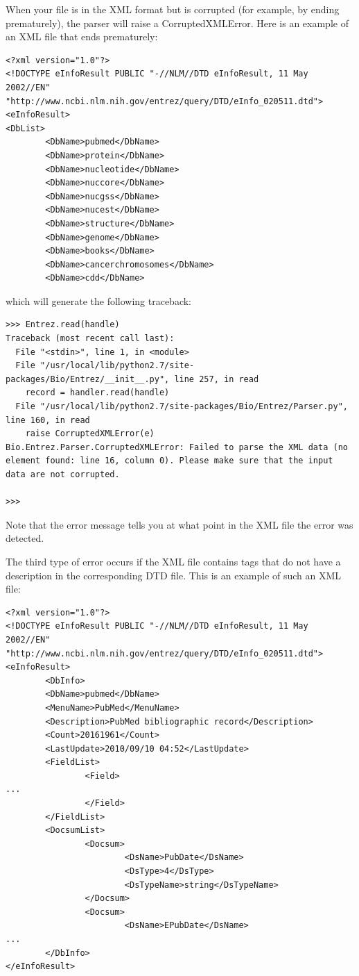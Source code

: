 \documentclass{report}
\begin{document}
When your file is in the XML format but is corrupted (for example, by ending prematurely), the parser will raise a CorruptedXMLError.
Here is an example of an XML file that ends prematurely:
\begin{verbatim}
<?xml version="1.0"?>
<!DOCTYPE eInfoResult PUBLIC "-//NLM//DTD eInfoResult, 11 May 2002//EN" "http://www.ncbi.nlm.nih.gov/entrez/query/DTD/eInfo_020511.dtd">
<eInfoResult>
<DbList>
        <DbName>pubmed</DbName>
        <DbName>protein</DbName>
        <DbName>nucleotide</DbName>
        <DbName>nuccore</DbName>
        <DbName>nucgss</DbName>
        <DbName>nucest</DbName>
        <DbName>structure</DbName>
        <DbName>genome</DbName>
        <DbName>books</DbName>
        <DbName>cancerchromosomes</DbName>
        <DbName>cdd</DbName>
\end{verbatim}
which will generate the following traceback:
\begin{verbatim}
>>> Entrez.read(handle)
Traceback (most recent call last):
  File "<stdin>", line 1, in <module>
  File "/usr/local/lib/python2.7/site-packages/Bio/Entrez/__init__.py", line 257, in read
    record = handler.read(handle)
  File "/usr/local/lib/python2.7/site-packages/Bio/Entrez/Parser.py", line 160, in read
    raise CorruptedXMLError(e)
Bio.Entrez.Parser.CorruptedXMLError: Failed to parse the XML data (no element found: line 16, column 0). Please make sure that the input data are not corrupted.

>>>
\end{verbatim}
Note that the error message tells you at what point in the XML file the error was detected.

The third type of error occurs if the XML file contains tags that do not have a description in the corresponding DTD file. This is an example of such an XML file:

\begin{verbatim}
<?xml version="1.0"?>
<!DOCTYPE eInfoResult PUBLIC "-//NLM//DTD eInfoResult, 11 May 2002//EN" "http://www.ncbi.nlm.nih.gov/entrez/query/DTD/eInfo_020511.dtd">
<eInfoResult>
        <DbInfo>
        <DbName>pubmed</DbName>
        <MenuName>PubMed</MenuName>
        <Description>PubMed bibliographic record</Description>
        <Count>20161961</Count>
        <LastUpdate>2010/09/10 04:52</LastUpdate>
        <FieldList>
                <Field>
...
                </Field>
        </FieldList>
        <DocsumList>
                <Docsum>
                        <DsName>PubDate</DsName>
                        <DsType>4</DsType>
                        <DsTypeName>string</DsTypeName>
                </Docsum>
                <Docsum>
                        <DsName>EPubDate</DsName>
...
        </DbInfo>
</eInfoResult>
\end{verbatim}
\end{document}
